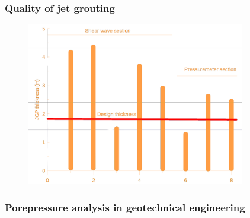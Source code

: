 \documentclass[notes]{beamer}
\begin{document}
\begin{frame}
\frametitle{Quality of jet grouting}
\begin{figure}[ht]
	\centering
	\includegraphics[width=0.85\textwidth]{figs/jet-grout-thickness.png}
\end{figure}
\end{frame}

\begin{frame}
\frametitle{Porepressure analysis in geotechnical engineering}
\end{frame}
\end{document}
